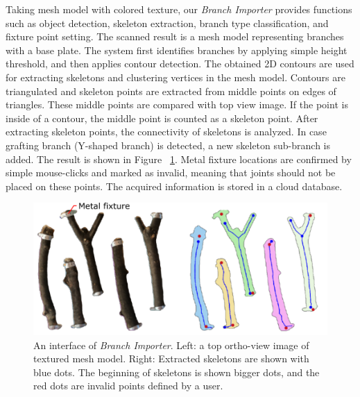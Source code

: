Taking mesh model with colored texture, our \textit{Branch Importer} provides functions such as object detection, skeleton extraction, branch type classification, and fixture point setting.
The scanned result is a mesh model representing branches with a base plate.
The system first identifies branches by applying simple height threshold, and then applies contour detection.
The obtained 2D contours are used for extracting skeletons and clustering vertices in the mesh model.
Contours are triangulated and skeleton points are extracted from middle points on edges of triangles.
These middle points are compared with top view image.
If the point is inside of a contour, the middle point is counted as a skeleton point.
After extracting skeleton points, the connectivity of skeletons is analyzed.
In case grafting branch (Y-shaped branch) is detected, a new skeleton sub-branch is added.
The result is shown in Figure ~\ref{fig:skeleton}.
Metal fixture locations are confirmed by simple mouse-clicks and marked as invalid, meaning that joints should not be placed on these points.
The acquired information is stored in a cloud database.

\begin{figure}[ht]
  \includegraphics[width = 0.4\paperwidth]{images/importer/importer_2.png}
  \caption{An interface of \textit{Branch Importer}. Left: a top ortho-view image of textured mesh model. Right: Extracted skeletons are shown with blue dots. The beginning of skeletons is shown bigger dots, and the red dots are invalid points defined by a user. }
  \label{fig:skeleton}
\end{figure}


